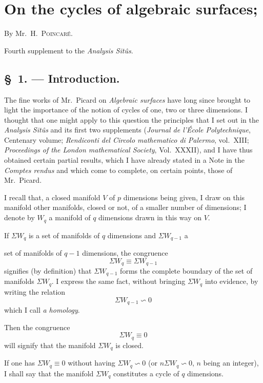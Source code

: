 \documentclass{article}
\begin{document}

\section*{On the cycles of algebraic surfaces;}

By Mr.~H.~\textsc{Poincaré}.

Fourth supplement to the \emph{Analysis Sitûs}.

\subsection*{\S~1. --- Introduction.}

The fine works of Mr.~Picard on \emph{Algebraic surfaces} have long since brought to light the importance of the notion of cycles of one, two or three dimensions. I thought that one might apply to this question the principles that I set out in the \emph{Analysis Sitûs} and its first two supplements (\emph{Journal de l'École Polytechnique}, Centenary volume; \emph{Rendiconti del Circolo mathematico di Palermo}, vol.\ XIII; \emph{Proceedings of the London mathematical Society}, Vol.\ XXXII), and I have thus obtained certain partial results, which I have already stated in a Note in the \emph{Comptes rendus} and which come to complete, on certain points, those of Mr.~Picard.

I recall that, a closed manifold $V$ of $p$ dimensions being given, I draw on this manifold other manifolds, closed or not, of a smaller number of dimensions; I denote by $W_{q}$ a manifold of $q$ dimensions drawn in this way on $V$.

If $\Sigma W_{q}$ is a set of manifolds of $q$ dimensions and $\Sigma W_{q-1}$ a

set of manifolds of $q - 1$ dimensions, the congruence
\[ \Sigma W_{q} \equiv \Sigma W_{q-1} \]
signifies (by definition) that $\Sigma W_{q-1}$ forms the complete boundary of the set of manifolds $\Sigma W_{q}$. I express the same fact, without bringing $\Sigma W_{q}$ into evidence, by writing the relation
\[ \Sigma W_{q-1} \backsim 0 \]
which I call \emph{a homology}.

Then the congruence
\[ \Sigma W_{q} \equiv 0 \]
will signify that the manifold $\Sigma W_{q}$ is closed.

If one has $\Sigma W_{q} \equiv 0$ without having $\Sigma W_{q} \backsim 0$ (or $n\Sigma W_{q} \backsim 0$, $n$ being an integer), I shall say that the manifold $\Sigma W_{q}$ constitutes a cycle of $q$ dimensions.
\end{document}
